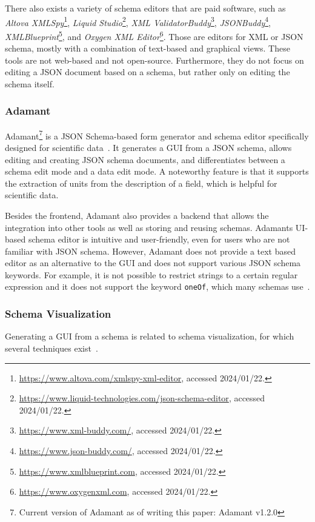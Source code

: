 There also exists a variety of schema editors that are paid software, such as \textit{Altova XMLSpy}\footnote{\url{https://www.altova.com/xmlspy-xml-editor}, accessed 2024/01/22.},
\textit{Liquid Studio}\footnote{\url{https://www.liquid-technologies.com/json-schema-editor}, accessed 2024/01/22.}, \textit{XML ValidatorBuddy}\footnote{\url{https://www.xml-buddy.com/}, accessed 2024/01/22.},
\textit{JSONBuddy}\footnote{\url{https://www.json-buddy.com/}, accessed 2024/01/22.}, \textit{XMLBlueprint}\footnote{\url{https://www.xmlblueprint.com}, accessed 2024/01/22.},
and \textit{Oxygen XML Editor}\footnote{\url{https://www.oxygenxml.com}, accessed 2024/01/22.}.
Those are editors for XML or JSON schema, mostly with a combination of text-based and graphical views.
These tools are not web-based and not open-source.
Furthermore, they do not focus on editing a JSON document based on a schema,
but rather only on editing the schema itself.


\subsubsection{Adamant}
Adamant\footnote{Current version of Adamant as of writing this paper: Adamant v1.2.0} is a JSON Schema-based form generator and schema editor specifically designed for scientific data~\cite{siffa2022adamant}.
It generates a GUI from a JSON schema, allows editing and creating JSON schema documents, and differentiates between a schema edit mode and a data edit mode.
A noteworthy feature is that it supports the extraction of units from the description of a field, which is helpful for scientific data.

Besides the frontend, Adamant also provides a backend that allows the integration into other tools as well as storing and reusing schemas.
Adamants UI-based schema editor is intuitive and user-friendly, even for users who are not familiar with JSON schema.
However, Adamant does not provide a text based editor as an alternative to the GUI and does not support various JSON schema keywords.
For example, it is not possible to restrict strings to a certain regular expression and it does not support the keyword \texttt{oneOf}, which many schemas use~\cite{baazizi2021empirical}.


\subsubsection{Schema Visualization}\label{subsubsec:schema-visualization}
Generating a GUI from a schema is related to schema visualization, for which several techniques exist~\cite{frasincar2006adapting, silva2019visualization, deligiannidis2007rdf, north2002visualization}.

